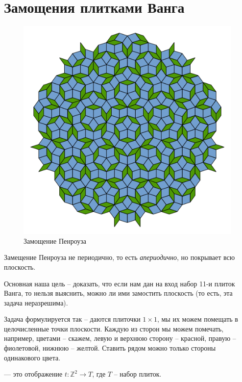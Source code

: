 \section{Замощения плитками Ванга}

\begin{figure}[ht]
    \centering
	\includegraphics[scale=0.75]{./imgs/Penrose_Tiling.png}
	\caption{Замощение Пенроуза}
\end{figure}
Замещение Пенроуза не периодично, то есть \textit{апериодично}, но покрывает всю плоскость.

Основная наша цель -- доказать, что если нам дан на вход набор 11-и плиток Ванга, то
нельзя выяснить, можно ли ими замостить плоскость (то есть, эта задача неразрешима).

Задача формулируется так -- даются плиточки $ 1 \times 1 $, мы их можем помещать в целочисленные точки плоскости. Каждую из сторон мы можем помечать, например, цветами -- скажем, левую и верхнюю сторону -- красной, правую -- фиолетовой, нижнюю -- желтой. Ставить рядом можно только стороны одинакового цвета.


\begin{defn}[Замощение]
     --- это отображение $ t\colon  \mathbb{Z}^2 \to T $, где $ T $ -- набор плиток.
\end{defn}

